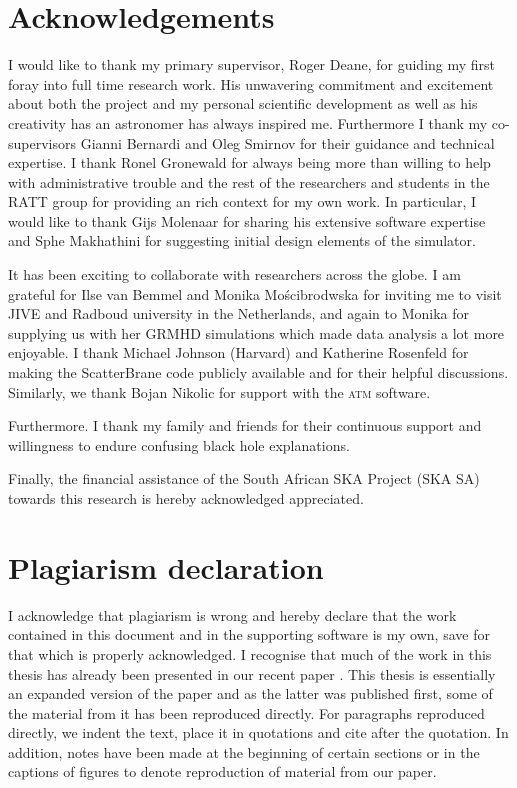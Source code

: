 
 
\chapter*{Acknowledgements}
I would like to thank my primary supervisor, Roger Deane, for guiding my first foray into full time research work. His unwavering commitment and excitement about both the project and my personal scientific development as well as his creativity has an astronomer has always inspired me. Furthermore I thank my co-supervisors Gianni Bernardi and Oleg Smirnov for their guidance and technical expertise. I thank Ronel Gronewald for always being more than willing to help with administrative trouble and the rest of the researchers and students in the RATT group for providing an rich context for my own work. In particular, I would like to thank Gijs Molenaar for sharing his extensive software expertise and Sphe Makhathini for suggesting initial design elements of the simulator. 


It has been exciting to collaborate with researchers across the globe. I am grateful for Ilse van Bemmel and Monika Mo\'{s}cibrodwska for inviting me to visit JIVE and Radboud university in the Netherlands, and again to Monika for supplying us with her GRMHD simulations which made data analysis a lot more enjoyable. I thank Michael Johnson (Harvard) and Katherine Rosenfeld for making the {\sc ScatterBrane} code publicly available and for their helpful discussions. Similarly, we thank Bojan Nikolic for support with the \textsc{atm} software.  

Furthermore. I thank my family and friends for their continuous support and willingness to endure confusing black hole explanations.

Finally, the financial assistance of the South African SKA Project (SKA SA) towards this research is hereby acknowledged appreciated. 

\chapter*{Plagiarism declaration}
 I acknowledge that plagiarism is wrong and hereby declare that the work contained in this document and in the supporting software is my own, save for that which is properly acknowledged. I recognise that much of the work in this thesis has already been presented in our recent paper \citep{Blecher_2016}. This thesis is essentially an expanded version of the paper and as the latter was published first, some of the material from it has been reproduced directly. For paragraphs reproduced directly, we indent the text, place it in quotations and cite \citep{Blecher_2016} after the quotation. In addition, notes have been made at the beginning of certain sections or in the captions of figures to denote reproduction of material from our paper.
 \vspace{55pt}
 
